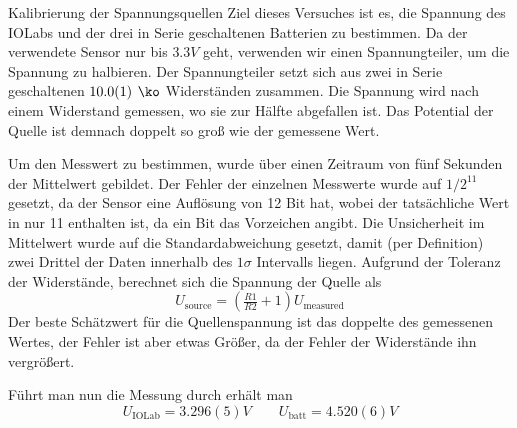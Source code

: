 \documentclass{alex_gp}
\begin{document}
\begin{mybox}{Kalibrierung der Spannungsquellen}
	Ziel dieses Versuches ist es, die Spannung des IOLabs und der drei in Serie geschaltenen Batterien zu bestimmen. Da der verwendete Sensor nur bis \( 3.3 \unit{V} \) geht, verwenden wir einen Spannungteiler, um die Spannung zu halbieren. Der Spannungteiler setzt sich aus zwei in Serie geschaltenen \( 10.0(1) \unit{\ko} \) Widerständen zusammen. Die Spannung wird nach einem Widerstand gemessen, wo sie zur Hälfte abgefallen ist. Das Potential der Quelle ist demnach doppelt so groß wie der gemessene Wert.
	
	Um den Messwert zu bestimmen, wurde über einen Zeitraum von fünf Sekunden der Mittelwert gebildet. Der Fehler der einzelnen Messwerte wurde auf \( 1/2^{11} \) gesetzt, da der Sensor eine Auflösung von 12 Bit hat, wobei der tatsächliche Wert in nur 11 enthalten ist, da ein Bit das Vorzeichen angibt. Die Unsicherheit im Mittelwert wurde auf die Standardabweichung gesetzt, damit (per Definition) zwei Drittel der Daten innerhalb des \( 1\sigma \) Intervalls liegen. Aufgrund der Toleranz der Widerstände, berechnet sich die Spannung der Quelle als
	\begin{equation}\label{eqn:1}
		U_{\text{source}} = \left(\tfrac{R1}{R2} + 1\right) U_{\text{measured}}
	\end{equation}
	Der beste Schätzwert für die Quellenspannung ist das doppelte des gemessenen Wertes, der Fehler ist aber etwas Größer, da der Fehler der Widerstände ihn vergrößert.
	
	Führt man nun die Messung durch erhält man 
	\begin{equation}\label{eqn:2}
		U_{\text{IOLab}} = 3.296(5) \unit{V} \qquad U_{\text{batt}} = 4.520(6) \unit{V} 
	\end{equation}
\end{mybox}
\end{document}
